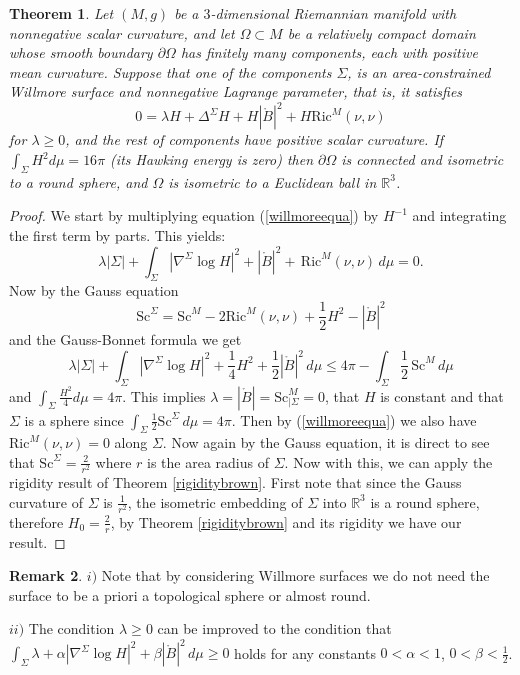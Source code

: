 \documentclass[12pt,a4paper]{amsart}
\theoremstyle{plain}
\newtheorem{theorem}{Theorem}[section]
\theoremstyle{definition}
\newtheorem{remark}[theorem]{Remark}
\begin{document}
\begin{theorem}\label{rigiditywillmore}
    Let $(M,g)$ be a $3$-dimensional Riemannian manifold with nonnegative scalar curvature,  and let  $\Omega \subset M$ be a relatively compact domain whose smooth boundary  $\partial \Omega $  has finitely many components, each with positive mean curvature. Suppose that one of the components $\Sigma$, is an area-constrained Willmore surface  and nonnegative Lagrange parameter, that is, it  satisfies
    \begin{equation}\label{willmoreequa}
        0= \lambda H  +\Delta^{\Sigma} H + H|\mathring{B}|^2+ H \mathrm{Ric}^M(\nu, \nu)
    \end{equation}
   for $\lambda \geq 0$, and the rest of components have positive scalar curvature.  If  $\int_{\Sigma } H^2 d\mu =16 \pi   $ (its Hawking energy is zero)  then   $ \partial \Omega$ is connected and  isometric to a round sphere, and $\Omega$ is isometric to a Euclidean ball in $\mathbb{R}^3$.   
\end{theorem}
\begin{proof}
 We start by multiplying equation (\ref{willmoreequa}) by \( H^{-1} \) and integrating the first term by parts. This yields:
\[
\lambda |\Sigma | + \int_{\Sigma }  |\nabla^{\Sigma}  \log H|^2 + |\mathring{B}|^2 +  \, \mathrm{Ric}^M(\nu, \nu)  \, d\mu = 0. 
\]
Now by the  Gauss equation 
$$ \mathrm{Sc}^{\Sigma} = \mathrm{Sc}^{M} - 2\mathrm{Ric}^M(\nu, \nu) + \frac{1}{2}H^2 - |\mathring{B}|^2 $$
and the Gauss-Bonnet formula we get
\[
\lambda |\Sigma | + \int_{\Sigma} |\nabla^{\Sigma}  \log H|^2 + \frac{1}{4} H^2 + \frac{1}{2} |\mathring{B}|^2  \, d\mu \leq 4\pi - \int_{\Sigma } \frac{1}{2} \, \mathrm{Sc}^M \, d\mu
\]   
and $ \int_{\Sigma } \frac{H^2}{4} d\mu =4 \pi   $.  This implies $\lambda=|\mathring{B}|= \mathrm{Sc}^M_{| \Sigma} = 0 $, that $H$ is constant and that $\Sigma$ is a sphere since $\int_{\Sigma } \frac{1}{2}\mathrm{Sc}^{\Sigma} \, d\mu = 4 \pi$. Then by (\ref{willmoreequa}) we also have $ \mathrm{Ric}^M(\nu, \nu)=0$ along $\Sigma $.  Now again by the Gauss equation, it is direct to see that $ \mathrm{Sc}^{\Sigma} = \frac{2}{r^2}$ where $r$ is the area radius of $\Sigma$. Now with this, we can apply the rigidity result of Theorem \ref{rigiditybrown}. First note that since the Gauss curvature of $\Sigma$ is  $ \frac{1}{r^2}$, the isometric  embedding  of $\Sigma$ into $\mathbb{R}^3$ is a round sphere, therefore $H_0= \frac{2}{r}$,  by Theorem \ref{rigiditybrown} and its rigidity we have our result. 
\end{proof}
\begin{remark}
 $ i)$ Note that by considering Willmore surfaces we do not need the surface to be a priori a topological sphere or almost round. 

 
 $ii)$ The condition $\lambda \geq 0 $ can be improved to the condition that $ \int_{\Sigma}  \lambda+\alpha|\nabla^{\Sigma}  \log H|^2  + \beta |\mathring{B}|^2  \, d\mu \geq 0 $ holds    for any constants $0<\alpha<1 $, $0<\beta<\frac{1}{2}$. 
\end{remark}
\end{document}
